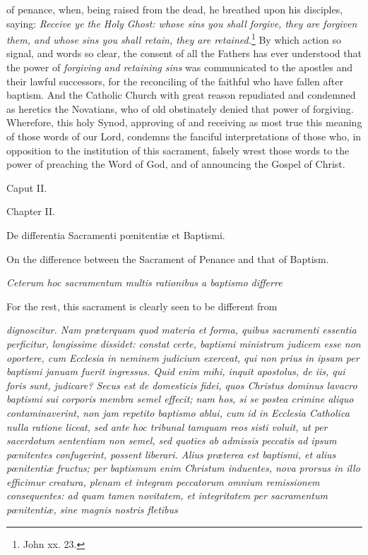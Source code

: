 of penance, when, being raised from the dead, he breathed upon his disciples, saying: \emph{Receive ye the Holy Ghost: whose sins you shall forgive, they are forgiven them, and whose sins you shall retain, they are retained.}\footnote{\par  John xx. 23.} By which action so signal, and words so clear, the consent of all the Fathers has ever understood that the power of \emph{forgiving and retaining sins} was communicated to the apostles and their lawful successors, for the reconciling of the faithful who have fallen after baptism. And the Catholic Church with great reason repudiated and condemned as heretics the Novatians, who of old obstinately denied that power of forgiving. Wherefore, this holy Synod, approving of and receiving as most true this meaning of those words of our Lord, condemns the fanciful interpretations of those who, in opposition to the institution of this sacrament, falsely wrest those words to the power of preaching the Word of God, and of announcing the Gospel of Christ.

Caput II.

Chapter II.

De differentia Sacramenti pœnitentiæ et Baptismi.

On the difference between the Sacrament of Penance and that of Baptism.

\emph{Ceterum hoc sacramentum multis rationibus a baptismo differre }

For the rest, this sacrament is clearly seen to be different from

\emph{dignoscitur. Nam præterquam quod materia et forma, quibus sacramenti essentia perficitur, longissime dissidet: constat certe, baptismi ministrum judicem esse non oportere, cum Ecclesia in neminem judicium exerceat, qui non prius in ipsam per baptismi januam fuerit ingressus. Quid enim mihi, inquit apostolus, de iis, qui foris sunt, judicare? Secus est de domesticis fidei, quos Christus dominus lavacro baptismi sui corporis membra semel effecit; nam hos, si se postea crimine aliquo contaminaverint, non jam repetito baptismo ablui, cum id in Ecclesia Catholica nulla ratione liceat, sed ante hoc tribunal tamquam reos sisti voluit, ut per sacerdotum sententiam non semel, sed quoties ab admissis peccatis ad ipsum pœnitentes confugerint, possent liberari. Alius præterea est baptismi, et alius pœnitentiæ fructus; per baptismum enim Christum induentes, nova prorsus in illo efficimur creatura, plenam et integram peccatorum omnium remissionem consequentes: ad quam tamen novitatem, et integritatem per sacramentum pœnitentiæ, sine magnis nostris fletibus}

